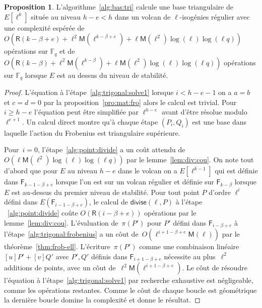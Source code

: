 \documentclass[10pt,a4paper]{book}
\theoremstyle{plain}
\theoremstyle{definition}
\theoremstyle{definition}
\theoremstyle{definition}
\newtheorem{prop}[thm]{Proposition}
\theoremstyle{definition}
\theoremstyle{remark}
\theoremstyle{remark}
\theoremstyle{definition}
\begin{document}
\begin{prop}
L'algorithme~\ref{alg:bas:tri} calcule une base triangulaire de $E[\ell^k]$ située au niveau $h-e<h$ dans un volcan de $\ell$-isogénies régulier avec une complexité espérée de $O(\mathsf{R}(k-\beta+e) + \ell^2\mathsf{M}(\ell^{k-\beta+e})+ \ell\mathsf{M}(\ell^2)\log(\ell)\log(\ell q))$ opérations sur $\mathbb{F}_q$ et de $O(\mathsf{R}(k-\beta) + \ell^2\mathsf{M}(\ell^{k-\beta}) + \ell\mathsf{M}(\ell^2)\log(\ell)\log(\ell q))$ opérations sur $\mathbb{F}_q$ lorsque $E$ est au dessus du niveau de stabilité.
\end{prop}

\begin{proof}
L'équation à l'étape~\ref{alg:trigonal:solve1} lorsque $i<h-e-1$ on a $a=b$ et 
$c=d=0$ par la proposition~\ref{pro:mat:fro} alors le calcul est trivial. Pour 
$i \geqslant h-e$ l'équation peut être simplifiée par  $\ell^{h-e}$ avant 
d'être résolue modulo $\ell^{e+1}$. Un calcul direct montre qu'à chaque étape 
$(P_i,Q_i)$ est une base dans laquelle l'action du Frobenius est triangulaire 
supérieure. 


Pour~$i = 0$, l'étape~\ref{alg:point:divide} a
 un coût attendu de $O(\ell \mathsf{M}(\ell^2)\log(\ell)\log(\ell q))$
par le lemme~\ref{lem:div:cou}.
  On note tout d'abord que pour $E$ au niveau $h-e$ dans le volcan on a 
  $E[\ell^{k-1}]$ qui est définie dans $\mathsf{F}_{k-1-\beta+e}$ lorsque l'on
 est sur un volcan régulier et définie sur $\mathsf{F}_{k-\beta}$ lorsque 
 $E$ est au-dessus du premier niveau de stabilité. Pour tout point $P$ d'ordre
 $\ell^i$ défini dans 
 $E(\mathsf{F}_{i-1-\beta+e})$, le calcul de $\mathsf{divise}(\ell, P)$ à 
 l'étape ~\ref{alg:point:divide} coûte $O(\mathsf{R}(i-\beta+e))$ opérations 
 par le lemme~\ref{lem:div:cou}.
  L'évaluation de~$\pi(P')$ pour $P'$ défini dans $\mathsf{F}_{i-\beta+e}$ à
   l'étape~\ref{alg:trigonal:frobenius} a un côut
  de~$O(\ell^{i+1-\beta+e}\mathsf{M}(\ell))$ par le théorème~\ref{thm:frob-ell}.
  L'écriture~$\pi(P')$ comme une combinaison linéaire~$[u] P' + [v] Q'$ avec 
  $P',Q'$ définis dans $\mathsf{F}_{i+1-\beta+e}$ nécessite au
  plus~$\ell^2$ additions de points, avec un côut de~$\ell^2
  \mathsf{M}(\ell^{i+1-\beta+e})$.
  Le côut de résoudre l'équation à l'étape~\ref{alg:trigonal:solve1}
  par recherche exhaustive est négligeable, comme les 
  opérations restantes. Comme le côut de chaque boucle est géométrique
  la dernière boucle domine la complexité et donne le résultat.
\end{proof}
\end{document}
